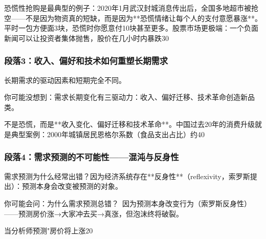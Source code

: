 \documentclass[a4paper,12pt]{book}
\begin{document}
恐慌性抢购是最典型的例子：2020年1月武汉封城消息传出后，全国多地超市被抢空——不是因为物资真的短缺，而是因为**恐慌情绪让每个人的支付意愿暴涨**。平时一包方便面3块，恐慌时你愿意付10块甚至更多。股票市场更极端：一个负面新闻可以让投资者集体抛售，股价在几小时内暴跌30%

	\subsubsection*{段落3：收入、偏好和技术如何重塑长期需求}
	长期需求的驱动因素和短期完全不同。
	\begin{tcolorbox}[colback=yellow!5, title=\textit{读者行为预测}]
		你可能没想到：需求长期变化有三驱动力：收入、偏好迁移、技术革命创造新品类。
	\end{tcolorbox}

不是恐慌，而是**收入变化、偏好迁移和技术革命**。中国过去20年的消费升级就是典型案例：2000年城镇居民恩格尔系数（食品支出占比）约40%

	\subsubsection*{段落4：需求预测的不可能性——混沌与反身性}
	需求预测为什么经常出错？因为经济系统存在**反身性**（reflexivity，索罗斯提出）：预测本身会改变被预测的对象。
	\begin{tcolorbox}[colback=yellow!5, title=\textit{读者行为预测}]
		你可能会问：为什么需求预测总错？\ 因为预测本身改变行为（索罗斯反身性）——预测房价涨→大家冲去买→真涨，但泡沫终将破裂。
	\end{tcolorbox}

当分析师预测"房价将上涨20%
\end{document}
